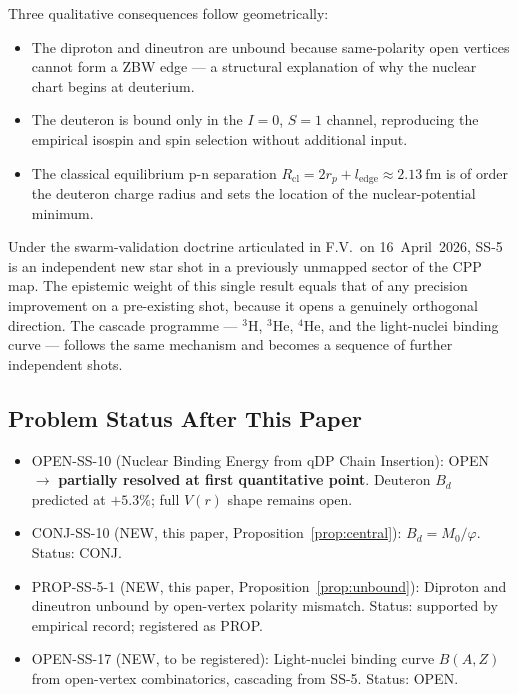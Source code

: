 \documentclass[11pt,letterpaper]{article}
\newcommand{\phig}{\varphi}
\newcommand{\Mzero}{M_0}
\newcommand{\ledge}{l_{\mathrm{edge}}}
\newcommand{\Bd}{B_{d}}
\newcommand{\rp}{r_{p}}
\begin{document}
Three qualitative consequences follow geometrically:
\begin{itemize}
\item The diproton and dineutron are unbound because same-polarity open vertices cannot form a ZBW edge --- a structural explanation of why the nuclear chart begins at deuterium.
\item The deuteron is bound only in the $I = 0$, $S = 1$ channel, reproducing the empirical isospin and spin selection without additional input.
\item The classical equilibrium p-n separation $R_{\mathrm{cl}} = 2\rp + \ledge \approx 2.13~\mathrm{fm}$ is of order the deuteron charge radius and sets the location of the nuclear-potential minimum.
\end{itemize}

Under the swarm-validation doctrine articulated in F.V.\ on 16~April~2026, SS-5 is an independent new star shot in a previously unmapped sector of the CPP map. The epistemic weight of this single result equals that of any precision improvement on a pre-existing shot, because it opens a genuinely orthogonal direction. The cascade programme --- ${}^{3}\mathrm{H}$, ${}^{3}\mathrm{He}$, ${}^{4}\mathrm{He}$, and the light-nuclei binding curve --- follows the same mechanism and becomes a sequence of further independent shots.

\subsection{Problem Status After This Paper}

\begin{itemize}
\item OPEN-SS-10 (Nuclear Binding Energy from qDP Chain Insertion): OPEN $\rightarrow$ \textbf{partially resolved at first quantitative point}. Deuteron $\Bd$ predicted at $+5.3\%$; full $V(r)$ shape remains open.
\item CONJ-SS-10 (NEW, this paper, Proposition~\ref{prop:central}): $\Bd = \Mzero/\phig$. Status: CONJ.
\item PROP-SS-5-1 (NEW, this paper, Proposition~\ref{prop:unbound}): Diproton and dineutron unbound by open-vertex polarity mismatch. Status: supported by empirical record; registered as PROP.
\item OPEN-SS-17 (NEW, to be registered): Light-nuclei binding curve $B(A, Z)$ from open-vertex combinatorics, cascading from SS-5. Status: OPEN.
\end{itemize}
\end{document}
